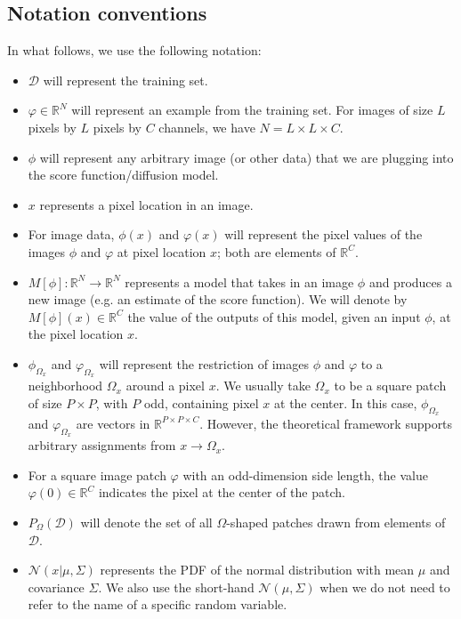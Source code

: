 \documentclass{article}
\theoremstyle{plain}
\theoremstyle{definition}
\theoremstyle{remark}
\begin{document}
\subsection{Notation conventions}
In what follows, we use the following notation:
\begin{itemize}
    \item $\mathcal{D}$ will represent the training set.
    \item $\varphi \in \mathbb{R}^N$ will represent an example from the training set. For images of size $L$ pixels by $L$ pixels by $C$ channels, we have $N=L\times L \times C$.  
    \item $\phi$ will represent any arbitrary image (or other data) that we are plugging into the score function/diffusion model. 
    \item $x$ represents a pixel location in an image.
    \item For image data, $\phi(x)$ and $\varphi(x)$ will represent the pixel values of the images $\phi$ and $\varphi$ at pixel location $x$; both are elements of $\mathbb{R}^C$. 
    \item $M[\phi]: \mathbb{R}^N \to \mathbb{R}^N$ represents a model that takes in an image $\phi$ and produces a new image (e.g. an estimate of the score function).  We will denote by $M[\phi](x) \in \mathbb{R}^C$ the value of the outputs of this model, given an input $\phi$, at the pixel location $x$.
    \item $\phi_{\Omega_x}$ and $\varphi_{\Omega_x}$ will represent the restriction of images $\phi$ and $\varphi$ to a neighborhood $\Omega_x$ around a pixel $x$. We usually take $\Omega_x$ to be a square patch of size $P \times P$, with $P$ odd, containing pixel $x$ at the center. In this case, $\phi_{\Omega_x}$ and $\varphi_{\Omega_x}$ are vectors in $\mathbb{R}^{P\times P\times C}$. However, the theoretical framework supports arbitrary assignments from $x \to \Omega_x$.
    \item For a square image patch $\varphi$ with an odd-dimension side length, the value $\varphi(0) \in \mathbb{R}^C$ indicates the pixel at the center of the patch.
    \item $P_{\Omega}(\mathcal{D})$ will denote the set of all $\Omega$-shaped patches drawn from elements of $\mathcal{D}$. 
    \item $\mathcal{N}(x|\mu, \Sigma)$ represents the PDF of the normal distribution with mean $\mu$ and covariance $\Sigma$.  We also use the short-hand $\mathcal{N}(\mu, \Sigma)$ when we do not need to refer to the name of a specific random variable. 
\end{itemize}
\end{document}
